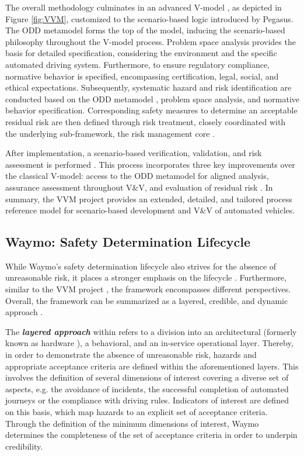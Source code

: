 The overall methodology culminates in an advanced V-model \cite{VVMOverall}, as depicted in Figure \ref{fig:VVM}, customized to the scenario-based logic introduced by Pegasus. The ODD metamodel forms the top of the model, inducing the scenario-based philosophy throughout the V-model process. Problem space analysis provides the basis for detailed specification, considering the environment and the specific automated driving system. Furthermore, to ensure regulatory compliance, normative behavior \cite{salem2022beitrag} is specified, encompassing certification, legal, social, and ethical expectations. Subsequently, systematic hazard  \cite{graubohm2020towards} and risk identification are conducted based on the ODD metamodel \cite{VVMOverall}, problem space analysis, and normative behavior specification. Corresponding safety measures to determine an acceptable residual risk are then defined through risk treatment, closely coordinated with the underlying sub-framework, the risk management core \cite{salem2023risk}.

After implementation, a scenario-based verification, validation, and risk assessment is performed \cite{riedmaier2020survey}. This process incorporates three key improvements over the classical V-model: access to the ODD metamodel for aligned analysis, assurance assessment throughout V\&V, and evaluation of residual risk \cite{VVMOverall}. In summary, the VVM project provides an extended, detailed, and tailored process reference model for scenario-based development and V\&V of automated vehicles.

\subsection{Waymo: Safety Determination Lifecycle}\label{Waymo}

While Waymo's safety determination lifecycle also strives for the absence of unreasonable risk, it places a stronger emphasis on the lifecycle \cite{favaro2023building}. Furthermore, similar to the VVM project \cite{VVMAPerspectives, stellet2019formalisation}, the framework encompasses different perspectives. Overall, the framework can be summarized as a layered, credible, and dynamic approach \cite{favaro2023building}.

The \textit{\textbf{layered approach}} within \cite{favaro2023building} refers to a division into an architectural (formerly known as hardware \cite{webb2020waymo}), a behavioral, and an in-service operational layer. Thereby, in order to demonstrate the absence of unreasonable risk, hazards and appropriate acceptance criteria are defined within the aforementioned layers. This involves the definition of several dimensions of interest covering a diverse set of aspects, e.g. the avoidance of incidents, the successful completion of automated journeys or the compliance with driving rules. Indicators of interest are defined on this basis, which map hazards to an explicit set of acceptance criteria. Through the definition of the minimum dimensions of interest, Waymo determines the completeness of the set of acceptance criteria in order to underpin credibility.  

